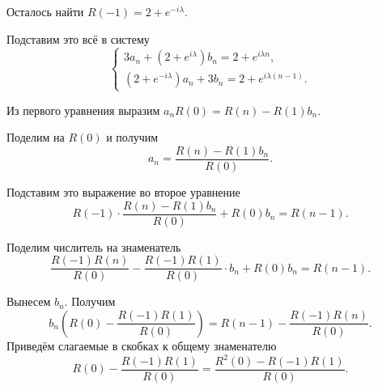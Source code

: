 \begin{enumerate}[label=\alph*)]
  Осталось найти $R \left( -1 \right) = 2 + e^{-i \lambda }$.

  Подставим это всё в систему
  \begin{equation*}
    \begin{cases}
      3a_n + \left( 2 + e^{i \lambda } \right) b_n = 2 + e^{i \lambda n}, \\
      \left( 2 + e^{-i \lambda } \right) a_n + 3b_n = 2 + e^{i \lambda \left( n - 1 \right) }.
    \end{cases}
  \end{equation*}

  Из первого уравнения выразим
  $a_n R \left( 0 \right) =
    R \left( n \right) - R \left( 1 \right) b_n$.

  Поделим на $R \left( 0 \right) $ и получим
  \begin{equation*}
    a_n =
    \frac{R \left( n \right) - R \left( 1 \right) b_n}{R \left( 0 \right) }.
  \end{equation*}

  Подставим это выражение во второе уравнение
  \begin{equation*}
    R \left( -1 \right) \cdot
    \frac{R \left( n \right) - R \left( 1 \right) b_n}{R \left( 0 \right) } +
    R \left( 0 \right) b_n =
    R \left( n - 1 \right).
  \end{equation*}

  Поделим числитель на знаменатель
  \begin{equation*}
    \frac{R \left( -1 \right) R \left( n \right) }{R \left( 0 \right) } -
    \frac{R \left( -1 \right) R \left( 1 \right) }{R \left( 0 \right) } \cdot b_n +
    R \left( 0 \right) b_n =
    R \left(n - 1 \right).
  \end{equation*}

  Вынесем $b_n$.
  Получим
  \begin{equation*}
    b_n \left(
      R \left( 0 \right) - \frac{R \left( -1 \right) R \left( 1 \right) }{R \left( 0 \right) }
    \right) =
    R \left( n - 1 \right) - \frac{R \left( -1 \right) R \left( n \right) }{R \left( 0 \right) }.
  \end{equation*}
  Приведём слагаемые в скобках к общему знаменателю
  \begin{equation*}
    R \left( 0 \right) - \frac{R \left( -1 \right) R \left( 1 \right) }{R \left( 0 \right) } =
    \frac{R^2 \left( 0 \right) - R \left( -1 \right) R \left( 1 \right) }{R \left( 0 \right) }.
  \end{equation*}


\end{enumerate}
